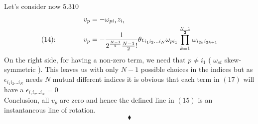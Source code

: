 Let's consider now $\mathbf{5.310}$
\begin{align}
v_p &= -  \omega_{pi_{1}}z_{i_{1}}\\
\text{(14):}\quad\quad\quad\quad v_p &= -\frac{1}{2^{\frac{N-1}{2}}\frac{N-1}{2}!}\theta \epsilon_{i_{1} i_{2} \dots i_{N}}\omega_{pi_{1}}\prod_{k=1}^{\frac{N-1}{2}}\omega_{i_{2k} i_{2k+1}}
\end{align}
On the right side, for having a non-zero term, we need that $p\ne i_{1}$ ( $\omega_{st}$ skew-symmetric ). This leaves us with only $N-1$ possible choices in the indices but as $\epsilon_{i_{1} i_{2} \dots i_{N}}$ needs $N$ mutual different indices it is obvious that each term in $(17)$ will have a $\epsilon_{i_{1} i_{2} \dots i_{N}}= 0$ \\
Conclusion, all $v_p$ are zero and hence the defined line in $(15)$ is an instantaneous line of rotation.
\\

$$\blacklozenge$$
\newpage 



